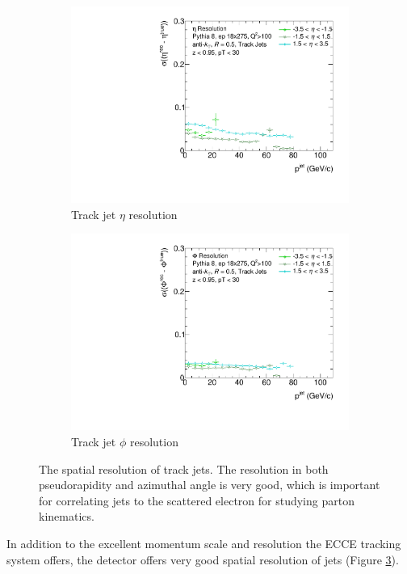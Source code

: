 \begin{figure}
    \centering
    \begin{subfigure}{0.4\textwidth}
        \centering
        \includegraphics[width=\linewidth]{figs/Final_Plots/EtaReso_track_grouped.pdf}
        \caption{Track jet $\eta$ resolution}
        \label{fig:track_eta_resolution}
    \end{subfigure}
    \hfill
    \begin{subfigure}{0.4\textwidth}
        \centering
        \includegraphics[width=\linewidth]{figs/Final_Plots/PhiReso_track_grouped.pdf}
        \caption{Track jet $\phi$ resolution}
        \label{fig:track_phi_resolution}
    \end{subfigure}
    \caption{The spatial resolution of track jets.  The resolution in both pseudorapidity and azimuthal angle is very good, which is important for correlating jets to the scattered electron for studying parton kinematics.  }
    \label{fig:track_spatial_reso_scale}
\end{figure}

In addition to the excellent momentum scale and resolution the ECCE tracking system offers, the detector offers very good spatial resolution of jets (Figure \ref{fig:track_spatial_reso_scale}).  
